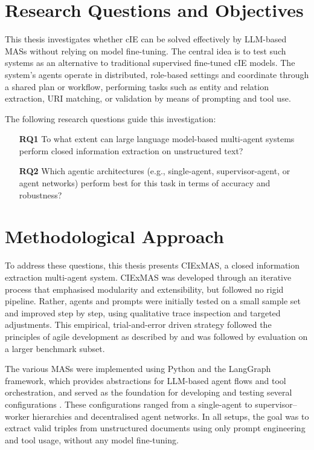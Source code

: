 \documentclass[a4paper,oneside,bibliography=totoc]{scrbook}
\begin{document}
\section{Research Questions and Objectives}
\label{sec:research_questions}

This thesis investigates whether \ac{cIE} can be solved effectively by \ac{LLM}-based \acp{MAS} without relying on model fine-tuning. The central idea is to test such systems as an alternative to traditional supervised fine-tuned \ac{cIE} models. The system's agents operate in distributed, role-based settings and coordinate through a shared plan or workflow, performing tasks such as entity and relation extraction, \ac{URI} matching, or validation by means of prompting and tool use.

The following research questions guide this investigation:

\begin{itemize}
  \item[\textbf{RQ1}] To what extent can large language model-based multi-agent systems perform closed information extraction on unstructured text?
  \item[\textbf{RQ2}] Which agentic architectures (e.g., single-agent, supervisor-agent, or agent networks) perform best for this task in terms of accuracy and robustness?
\end{itemize}

\section{Methodological Approach}
\label{sec:methodology}

To address these questions, this thesis presents CIExMAS, a closed information extraction multi-agent system. CIExMAS was developed through an iterative process that emphasised modularity and extensibility, but followed no rigid pipeline. Rather, agents and prompts were initially tested on a small sample set and improved step by step, using qualitative trace inspection and targeted adjustments. This empirical, trial-and-error driven strategy followed the principles of agile development as described by \citet{Abrahamsson2017} and was followed by evaluation on a larger benchmark subset.

The various \acp{MAS} were implemented using Python and the LangGraph framework, which provides abstractions for \ac{LLM}-based agent flows and tool orchestration, and served as the foundation for developing and testing several configurations \cite{LangChain2025}. These configurations ranged from a single-agent to supervisor–worker hierarchies and decentralised agent networks. In all setups, the goal was to extract valid triples from unstructured documents using only prompt engineering and tool usage, without any model fine-tuning.
\end{document}
